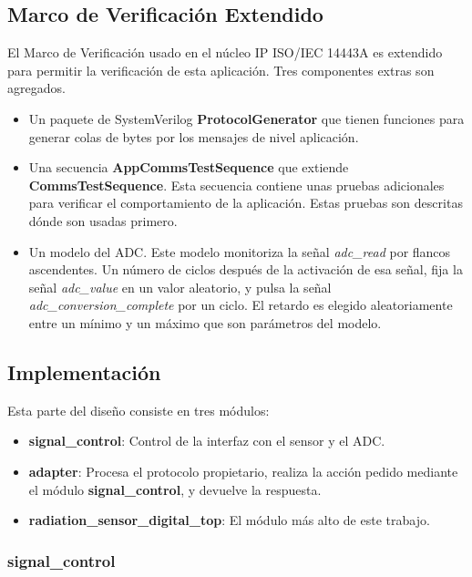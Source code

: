 \documentclass[a4paper, twoside, 11pt]{report}
\begin{document}
\FloatBarrier
\subsection{Marco de Verificación Extendido}

El Marco de Verificación usado en el núcleo IP ISO/IEC 14443A es extendido para permitir la verificación de esta aplicación. Tres componentes extras son agregados. 

\begin{itemize}
  \item Un paquete de SystemVerilog \textbf{ProtocolGenerator} que tienen funciones para generar colas de bytes por los mensajes de nivel aplicación.
  \item Una secuencia \textbf{AppCommsTestSequence} que extiende \textbf{CommsTestSequence}. Esta secuencia contiene unas pruebas adicionales para verificar el comportamiento de la aplicación. Estas pruebas son descritas dónde son usadas primero.
  \item Un modelo del ADC. Este modelo monitoriza la señal \textit{adc\_read} por flancos ascendentes. Un número de ciclos después de la activación de esa señal, fija la señal \textit{adc\_value} en un valor aleatorio, y pulsa la señal \textit{adc\_conversion\_complete} por un ciclo. El retardo es elegido aleatoriamente entre un mínimo y un máximo que son parámetros del modelo.
\end{itemize}

\FloatBarrier
\subsection{Implementación}

Esta parte del diseño consiste en tres módulos:

\begin{itemize}
  \item \textbf{signal\_control}: Control de la interfaz con el sensor y el ADC.
  \item \textbf{adapter}: Procesa el protocolo propietario, realiza la acción pedido mediante el módulo \textbf{signal\_control}, y devuelve la respuesta.
  \item \textbf{radiation\_sensor\_digital\_top}: El módulo más alto de este trabajo.
\end{itemize}

\FloatBarrier
\subsubsection{signal\_control}
\end{document}
